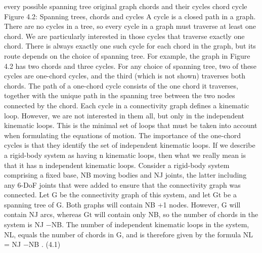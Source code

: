 every possible spanning tree original graph chords and their cycles chord cycle Figure 4.2: Spanning trees, chords and cycles A cycle is a closed path in a graph. There are no cycles in a tree, so every cycle in a graph must traverse at least one chord. We are particularly interested in those cycles that traverse exactly one chord. There is always exactly one such cycle for each chord in the graph, but its route depends on the choice of spanning tree. For example, the graph in Figure 4.2 has two chords and three cycles. For any choice of spanning tree, two of these cycles are one-chord cycles, and the third (which is not shown) traverses both chords. The path of a one-chord cycle consists of the one chord it traverses, together with the unique path in the spanning tree between the two nodes connected by the chord. Each cycle in a connectivity graph defines a kinematic loop. However, we are not interested in them all, but only in the independent kinematic loops. This is the minimal set of loops that must be taken into account when formulating the equations of motion. The importance of the one-chord cycles is that they identify the set of independent kinematic loops. If we describe a rigid-body system as having n kinematic loops, then what we really mean is that it has n independent kinematic loops. Consider a rigid-body system comprising a fixed base, NB moving bodies and NJ joints, the latter including any 6-DoF joints that were added to ensure that the connectivity graph was connected. Let G be the connectivity graph of this system, and let Gt be a spanning tree of G. Both graphs will contain NB +1 nodes. However, G will contain NJ arcs, whereas Gt will contain only NB, so the number of chords in the system is NJ −NB. The number of independent kinematic loops in the system, NL, equals the number of chords in G, and is therefore given by the formula NL = NJ −NB . (4.1)

